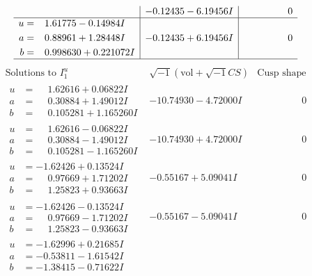 \documentclass[1p]{elsarticle_modified}
\theoremstyle{definition}
\newcommand{\I}{\sqrt{-1}}
\begin{document}
$$\begin{array}{c|c|c}
 & -0.12435 - 6.19456 I & \phantom{-0.000000 } 0 \\ \hline\begin{aligned}
u &= \phantom{-}1.61775 - 0.14984 I \\
a &= \phantom{-}0.88961 + 1.28448 I \\
b &= \phantom{-}0.998630 + 0.221072 I\end{aligned}
 & -0.12435 + 6.19456 I & \phantom{-0.000000 } 0\\
 \hline 
 \end{array}$$\newpage$$\begin{array}{c|c|c}  
\text{Solutions to }I^u_{1}& \I (\text{vol} + \sqrt{-1}CS) & \text{Cusp shape}\\
 \hline 
\begin{aligned}
u &= \phantom{-}1.62616 + 0.06822 I \\
a &= \phantom{-}0.30884 + 1.49012 I \\
b &= \phantom{-}0.105281 + 1.165260 I\end{aligned}
 & -10.74930 - 4.72000 I & \phantom{-0.000000 } 0 \\ \hline\begin{aligned}
u &= \phantom{-}1.62616 - 0.06822 I \\
a &= \phantom{-}0.30884 - 1.49012 I \\
b &= \phantom{-}0.105281 - 1.165260 I\end{aligned}
 & -10.74930 + 4.72000 I & \phantom{-0.000000 } 0 \\ \hline\begin{aligned}
u &= -1.62426 + 0.13524 I \\
a &= \phantom{-}0.97669 + 1.71202 I \\
b &= \phantom{-}1.25823 + 0.93663 I\end{aligned}
 & -0.55167 + 5.09041 I & \phantom{-0.000000 } 0 \\ \hline\begin{aligned}
u &= -1.62426 - 0.13524 I \\
a &= \phantom{-}0.97669 - 1.71202 I \\
b &= \phantom{-}1.25823 - 0.93663 I\end{aligned}
 & -0.55167 - 5.09041 I & \phantom{-0.000000 } 0 \\ \hline\begin{aligned}
u &= -1.62996 + 0.21685 I \\
a &= -0.53811 - 1.61542 I \\
b &= -1.38415 - 0.71622 I\end{aligned}

\end{array}$$
\end{document}
